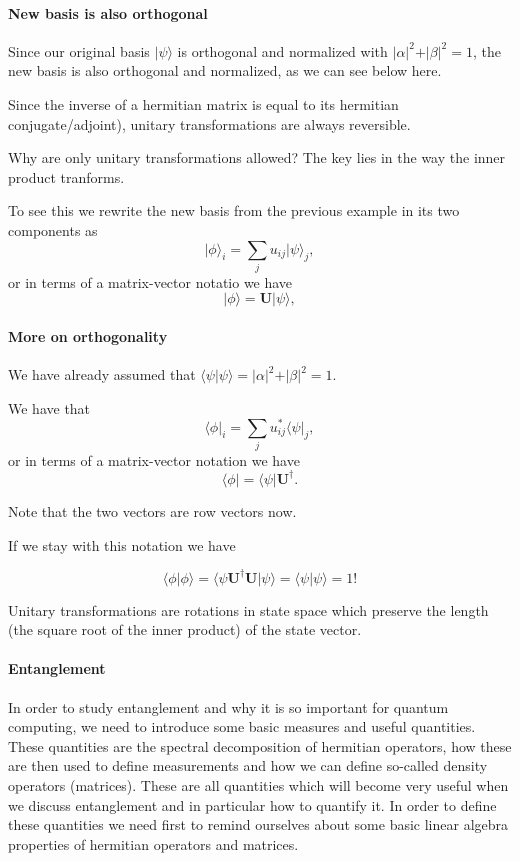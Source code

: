 \paragraph{New basis is also orthogonal}

Since our original basis $\vert \psi\rangle$ is orthogonal and normalized with $\vert\alpha\vert^2+\vert\beta\vert^2=1$, the new basis is also orthogonal and normalized, as we can see below here.

Since the inverse of a hermitian matrix is equal to its hermitian
conjugate/adjoint), unitary transformations are always reversible.

Why are only unitary transformations allowed? The key lies in the way the inner product tranforms.

To see this we rewrite the new basis from the previous example in its two components as
\[
\vert \phi\rangle_i=\sum_{j}u_{ij}\vert \psi\rangle_j,
\]
or in terms of a matrix-vector notatio we have
\[
\vert \phi\rangle=\bm{U}\vert \psi\rangle,
\]


\paragraph{More on orthogonality}

We have already assumed that $\langle \psi \vert \psi \rangle = \vert\alpha\vert^2+\vert\beta\vert^2=1$.

We have that 
\[
\langle \phi\vert_i=\sum_{j}u_{ij}^*\langle \psi\vert_j,
\]
or in terms of a matrix-vector notation we have
\[
\langle \phi\vert=\langle \psi\vert\bm{U}^{\dagger}.
\]

Note that the two vectors are row vectors now.

If we stay with this notation we have

\[
\langle \phi\vert\phi\rangle = \langle \psi \bm{U}^{\dagger}\bm{U}\vert \psi\rangle = \langle \psi\vert \psi\rangle=1!
\]

Unitary transformations are rotations in state space which preserve the
length (the square root of the inner product) of the state vector.


\paragraph{Entanglement}

In order to study entanglement and why it is so important for quantum
computing, we need to introduce some basic measures and useful
quantities.  These quantities are the spectral decomposition of
hermitian operators, how these are then used to define measurements
and how we can define so-called density operators (matrices). These
are all quantities which will become very useful when we discuss
entanglement and in particular how to quantify it. In order to define
these quantities we need first to remind ourselves about some basic linear
algebra properties of hermitian operators and matrices.


